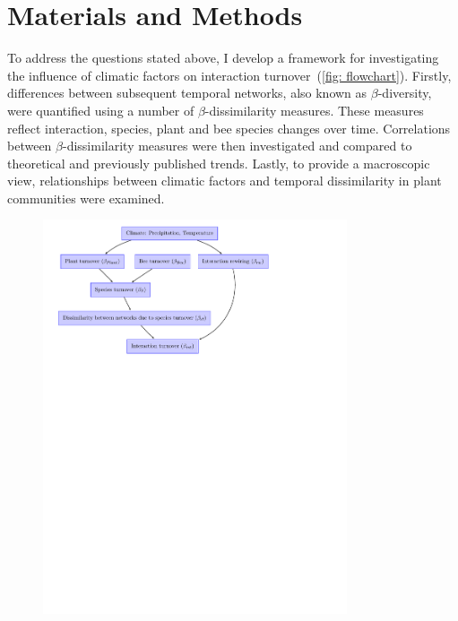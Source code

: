 \documentclass[11pt]{article}
\begin{document}
\newpage
\section{Materials and Methods} %

To address the questions stated above, I develop a framework for investigating the influence of climatic factors on interaction turnover~(\autoref{fig: flowchart}). Firstly, differences between subsequent temporal networks, also known as $\beta$-diversity, were quantified using a number of $\beta$-dissimilarity measures. These measures reflect interaction, species, plant and bee species changes over time. Correlations between $\beta$-dissimilarity measures were then investigated and compared to theoretical and previously published trends. Lastly, to provide a macroscopic view, relationships between climatic factors and temporal dissimilarity in plant communities were examined.\\

\begin{figure}[h]
  \centering
    \includegraphics[width=0.8\textwidth]{flowchart.pdf} \\
    \label{fig: flowchart}
\end{figure}
\vspace{-0.3cm}
\end{document}
